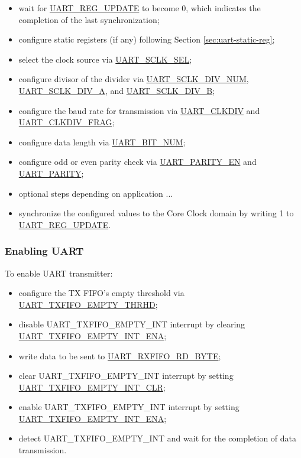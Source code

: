 \documentclass[main\_\_EN.tex]{subfiles}
\begin{document}
\begin{itemize}
    \item wait for \hyperref[fielddesc:UARTREGUPDATE]{UART\_REG\_UPDATE} to become 0, which indicates the completion of the last synchronization;
    \item configure static registers (if any) following Section \ref{sec:uart-static-reg};
    \item select the clock source via \hyperref[fielddesc:UARTSCLKSEL]{UART\_SCLK\_SEL};
    \item configure divisor of the divider via \hyperref[fielddesc:UARTSCLKDIVNUM]{UART\_SCLK\_DIV\_NUM}, \hyperref[fielddesc:UARTSCLKDIVA]{UART\_SCLK\_DIV\_A}, and \hyperref[fielddesc:UARTSCLKDIVB]{UART\_SCLK\_DIV\_B};
    \item configure the baud rate for transmission via \hyperref[fielddesc:UARTCLKDIV]{UART\_CLKDIV} and \hyperref[fielddesc:UARTCLKDIVFRAG]{UART\_CLKDIV\_FRAG};
    \item configure data length via \hyperref[fielddesc:UARTBITNUM]{UART\_BIT\_NUM};
    \item configure odd or even parity check via \hyperref[fielddesc:UARTPARITYEN]{UART\_PARITY\_EN} and \hyperref[fielddesc:UARTPARITY]{UART\_PARITY};
    \item optional steps depending on application ...
    \item synchronize the configured values to the Core Clock domain by writing 1 to \hyperref[fielddesc:UARTREGUPDATE]{UART\_REG\_UPDATE}.
\end{itemize}

\subsubsection{Enabling UART}

To enable UART transmitter:

\begin{itemize}
    \item configure the TX FIFO's empty threshold via \hyperref[fielddesc:UARTTXFIFOEMPTYTHRHD]{UART\_TXFIFO\_EMPTY\_THRHD};
    \item disable UART\_TXFIFO\_EMPTY\_INT interrupt by clearing \hyperref[fielddesc:UARTTXFIFOEMPTYINTENA]{UART\_TXFIFO\_EMPTY\_INT\_ENA};
    \item write data to be sent to \hyperref[fielddesc:UARTRXFIFORDBYTE]{UART\_RXFIFO\_RD\_BYTE};
    \item clear UART\_TXFIFO\_EMPTY\_INT interrupt by setting  \hyperref[fielddesc:UARTTXFIFOEMPTYINTCLR]{UART\_TXFIFO\_EMPTY\_INT\_CLR};
    \item enable UART\_TXFIFO\_EMPTY\_INT interrupt by setting \hyperref[fielddesc:UARTTXFIFOEMPTYINTENA]{UART\_TXFIFO\_EMPTY\_INT\_ENA};
    \item detect UART\_TXFIFO\_EMPTY\_INT and wait for the completion of data transmission.
\end{itemize}
\end{document}

